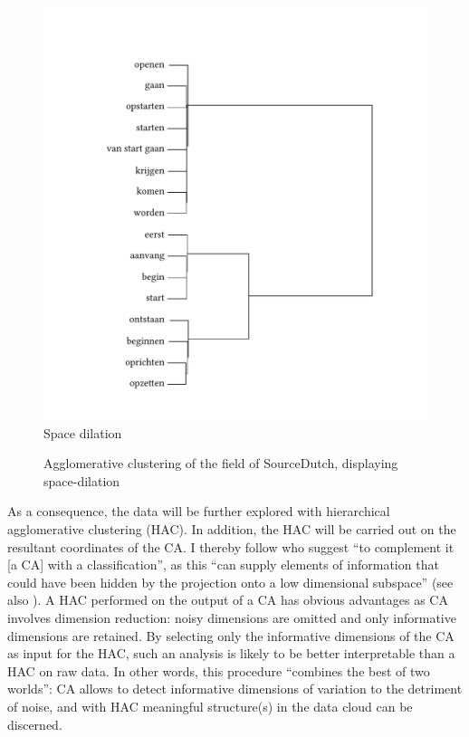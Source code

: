 \begin{figure}%
\includegraphics[height=.4\textheight]{figures/tree29.pdf}
Space dilation
\caption{\label{fig:3:29} Agglomerative clustering of the field of SourceDutch, displaying space-dilation}
\end{figure}

As a consequence, the data will be further explored with hierarchical agglomerative clustering (HAC). In addition, the HAC will be carried out on the resultant coordinates of the CA. I thereby follow \citet[335]{cuadras_correspondence_1993} who suggest “to complement it [a CA] with a classification”, as this “can supply elements of information that could have been hidden by the projection onto a low dimensional subspace” (see also \citealt[28]{ciampi_correspondence_2005}). A HAC performed on the output of a CA has obvious advantages as CA involves dimension reduction: noisy dimensions are omitted and only informative dimensions are retained. By selecting only the informative dimensions of the CA as input for the HAC, such an analysis is likely to be better interpretable than a HAC on raw data. In other words, this procedure ``combines the best of two worlds'': CA allows to detect informative dimensions of variation to the detriment of noise, and with HAC meaningful structure(s) in the data cloud can be discerned.


